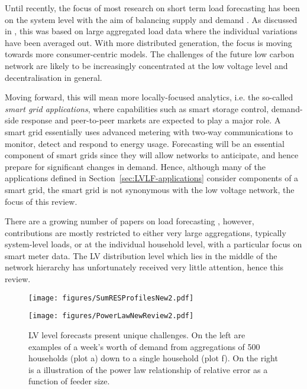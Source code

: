 Until recently, the focus of most research on short term load forecasting has been on the system level with the aim of balancing supply and demand \cite{Tao2020efa}. As discussed in \cite{diamantoulakis2015bda}, this was based on large aggregated load data where the individual variations have been averaged out. With more distributed generation, the focus is moving towards more consumer-centric models. The challenges of the future low carbon network are likely to be increasingly concentrated at the low voltage level and decentralisation in general.  

Moving forward, this will mean more locally-focused analytics, i.e. the so-called \textit{smart grid applications}, where capabilities such as smart storage control, demand-side response and peer-to-peer markets are expected to play a major role. A smart grid essentially uses advanced metering with two-way
communications to monitor, detect and respond to energy usage. Forecasting will be an essential component of smart grids since they will allow networks to anticipate, and hence prepare for significant changes in demand. Hence, although many of the applications defined in Section~\ref{sec:LVLF-applications} consider components of a smart grid, the smart grid is not synonymous with the low voltage network, the focus of this review.

There are a growing number of papers on load forecasting \cite{Tao2016pel, Tao2020efa}, however, contributions are mostly restricted to either very large aggregations, typically system-level loads, or at the individual household level, with a particular focus on smart meter data. The LV distribution level which lies in the middle of the network hierarchy has unfortunately received very little attention, hence this review. 

\begin{figure*}
	\begin{multicols}{2}
		\texttt{[image: figures/SumRESProfilesNew2.pdf]}\par 
		\texttt{[image: figures/PowerLawNewReview2.pdf]}\par 
	\end{multicols}
	\caption{LV level forecasts present unique challenges. On the left are examples of a week's worth of demand from aggregations of 500 households (plot a) down to a single household (plot f). On the right is a illustration of the power law relationship of relative error as a function of feeder size.}
	\label{lvplots}
\end{figure*}

